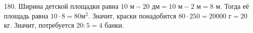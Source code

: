 180. Ширина детской площадки равна $10\text{ м}-20 \text{ дм}=10\text{ м}-2\text{ м}=8\text{ м}.$ Тогда её площадь равна $10\cdot8=80\text{м}^2.$ Значит, краски понадобится $80\cdot250=20000\text{ г}=20$кг. Значит, потребуется $20:5=4$ банки.\\
